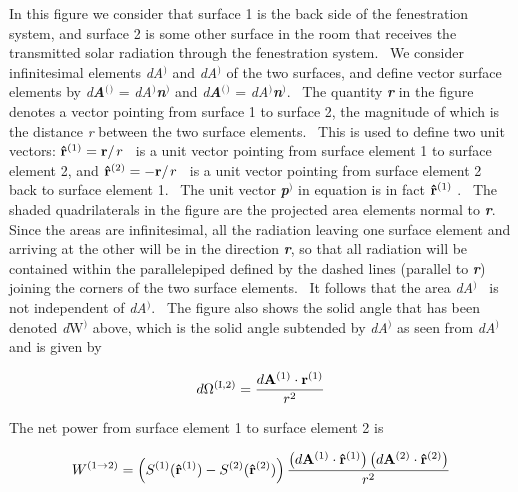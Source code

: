 In this figure we consider that surface 1 is the back side of the fenestration system, and surface 2 is some other surface in the room that receives the transmitted solar radiation through the fenestration system.~ We consider infinitesimal elements \emph{dA}\(^{)}\) and \emph{dA}\(^{)}\) of the two surfaces, and define vector surface elements by \emph{d\textbf{A}}\textbf{\(^{(}\)}\(^{)}\) = \emph{dA}\(^{)}\)\textbf{\emph{n}}\(^{)}\) and \emph{d\textbf{A}}\textbf{\(^{(}\)}\(^{)}\) = \emph{dA}\(^{)}\)\textbf{\emph{n}}\(^{)}\).~ The quantity \textbf{\emph{r}} in the figure denotes a vector pointing from surface 1 to surface 2, the magnitude of which is the distance \emph{r} between the two surface elements.~ This is used to define two unit vectors: \({{\bf{\hat r}}^{{\rm{(1)}}}} = {{\bf{r}} \mathord{\left/ {\vphantom {{\bf{r}} r}} \right. } r}\) ~is a unit vector pointing from surface element 1 to surface element 2, and \({{\bf{\hat r}}^{{\rm{(2)}}}} = - {{\bf{r}} \mathord{\left/ {\vphantom {{\bf{r}} r}} \right. } r}\) ~is a unit vector pointing from surface element 2 back to surface element 1.~ The unit vector \textbf{\emph{p}}\(^{)}\) in equation is in fact \({{\bf{\hat r}}^{{\rm{(1)}}}}\) .~ The shaded quadrilaterals in the figure are the projected area elements normal to \textbf{\emph{r}}.~ Since the areas are infinitesimal, all the radiation leaving one surface element and arriving at the other will be in the direction \textbf{\emph{r}}, so that all radiation will be contained within the parallelepiped defined by the dashed lines (parallel to \textbf{\emph{r}}) joining the corners of the two surface elements.~ It follows that the area \emph{dA}\(^{)}\)~ is not independent of \emph{dA}\(^{)}\).~ The figure also shows the solid angle that has been denoted \emph{d}W\(^{)}\) above, which is the solid angle subtended by \emph{dA}\(^{)}\) as seen from \emph{dA}\(^{)}\) and is given by

\begin{equation}
d{\Omega ^{{\rm{(I,2)}}}} = \frac{{d{{\bf{A}}^{{\rm{(1)}}}} \cdot {{\bf{r}}^{{\rm{(1)}}}}}}{{{r^2}}}
\end{equation}

The net power from surface element 1 to surface element 2 is

\begin{equation}
{W^{(1 \to 2)}} = \left( {{S^{{\rm{(1)}}}}({{{\bf{\hat r}}}^{{\rm{(1)}}}}) - {S^{{\rm{(2)}}}}({{{\bf{\hat r}}}^{{\rm{(2)}}}})} \right)\frac{{\left( {d{{\bf{A}}^{{\rm{(1)}}}} \cdot {{{\bf{\hat r}}}^{{\rm{(1)}}}}} \right)\left( {d{{\bf{A}}^{{\rm{(2)}}}} \cdot {{{\bf{\hat r}}}^{{\rm{(2)}}}}} \right)}}{{{r^2}}}
\end{equation}

